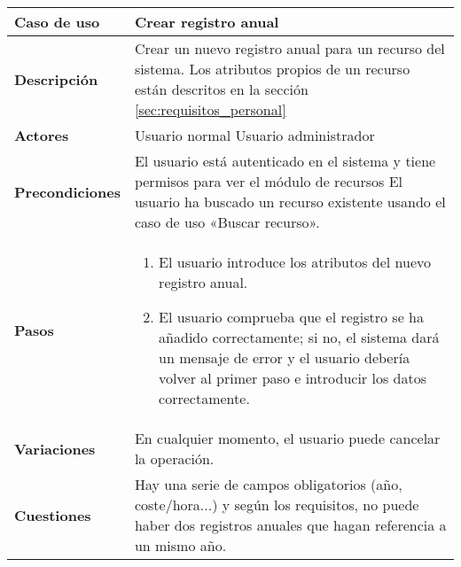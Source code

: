 \begin{tabular}{|p{1.25in}|p{3.65in}|}\hline
\textbf{Caso de uso} & \textbf{Crear registro anual}\\\hline\hline
\textbf{Descripción} & Crear un nuevo registro anual para un recurso del
sistema. Los atributos propios de un recurso están descritos en la sección
\ref{sec:requisitos_personal}\\\hline
\textbf{Actores} & Usuario normal \newline Usuario administrador\\\hline
\textbf{Precondiciones} & El usuario está autenticado en el sistema y
tiene permisos para ver el módulo de recursos \newline El usuario ha
buscado un recurso existente usando el caso de uso «Buscar recurso».\\\hline
\textbf{Pasos} & 
  \begin{enumerate}
   \item El usuario introduce los atributos del nuevo registro anual.
   \item El usuario comprueba que el registro se ha añadido correctamente; si
no, el sistema dará un mensaje de error y el usuario debería volver al primer
paso e introducir los datos correctamente.
  \end{enumerate}
\\\hline
\textbf{Variaciones} & En cualquier momento, el usuario puede cancelar
la operación.\\\hline
\textbf{Cuestiones} & Hay una serie de campos obligatorios (año,
coste/hora...) y según los requisitos, no puede haber dos registros
anuales que hagan referencia a un mismo año.\\\hline
\end{tabular}


